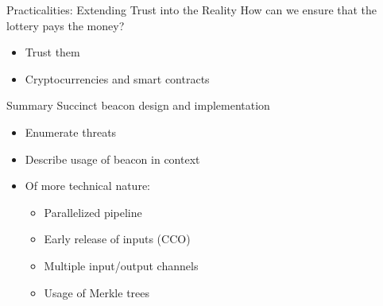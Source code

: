 \begin{frame}{Practicalities: Extending Trust into the Reality}
    How can we ensure that the lottery pays the money?
    \pause
    \begin{itemize}
        \item Trust them
        \pause
        \item Cryptocurrencies and smart contracts
    \end{itemize}
\end{frame}

\begin{frame}{Summary}
    Succinct beacon design and implementation
    \begin{itemize}
        \item Enumerate threats
        \item Describe usage of beacon in context
        \item Of more technical nature:
        \begin{itemize}
            \item Parallelized pipeline
            \item Early release of inputs (CCO)
            \item Multiple input/output channels
            \item Usage of Merkle trees
        \end{itemize}
    \end{itemize}
\end{frame}
